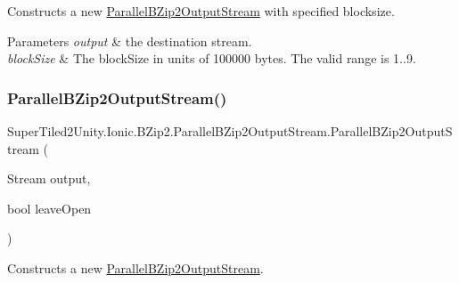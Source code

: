 Constructs a new {\ttfamily \mbox{\hyperlink{class_super_tiled2_unity_1_1_ionic_1_1_b_zip2_1_1_parallel_b_zip2_output_stream}{Parallel\+B\+Zip2\+Output\+Stream}}} with specified blocksize. 


\begin{DoxyParams}{Parameters}
{\em output} & the destination stream.\\
\hline
{\em block\+Size} & The block\+Size in units of 100000 bytes. The valid range is 1..9. \\
\hline
\end{DoxyParams}
\mbox{\label{class_super_tiled2_unity_1_1_ionic_1_1_b_zip2_1_1_parallel_b_zip2_output_stream_abb0fdad0631c15f32ee5a324d667628d}} 
\subsubsection{\texorpdfstring{Parallel\+B\+Zip2\+Output\+Stream()}{ParallelBZip2OutputStream()}\hspace{0.1cm}{\footnotesize\ttfamily [3/4]}}
{\footnotesize\ttfamily Super\+Tiled2\+Unity.\+Ionic.\+B\+Zip2.\+Parallel\+B\+Zip2\+Output\+Stream.\+Parallel\+B\+Zip2\+Output\+Stream (\begin{DoxyParamCaption}\item[{Stream}]{output,  }\item[{bool}]{leave\+Open }\end{DoxyParamCaption})}



Constructs a new {\ttfamily \mbox{\hyperlink{class_super_tiled2_unity_1_1_ionic_1_1_b_zip2_1_1_parallel_b_zip2_output_stream}{Parallel\+B\+Zip2\+Output\+Stream}}}. 


